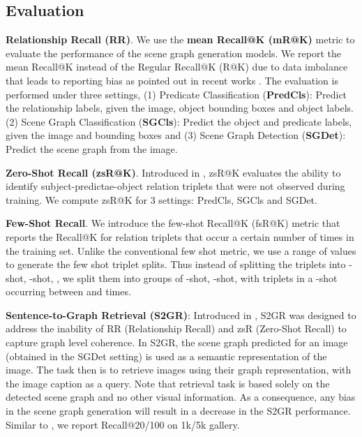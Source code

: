 \documentclass[final]{cvpr}
\begin{document}
\subsection{Evaluation}


\noindent
\textbf{Relationship Recall (RR)}. We use the \textbf{mean Recall@K (mR@K)} metric \cite{tang2019learning} to evaluate the performance of the scene graph generation models. We report the mean Recall@K instead of the Regular Recall@K (R@K) due to data imbalance that leads to reporting bias as pointed out in recent works \cite{tang2020unbiased}. The evaluation is performed under three settings, (1) Predicate Classification (\textbf{PredCls}): Predict the relationship labels, given the image, object bounding boxes and object labels. (2) Scene Graph Classification (\textbf{SGCls}): Predict the object and predicate labels, given the image and bounding boxes and (3) Scene Graph Detection (\textbf{SGDet}): Predict the scene graph from the image.

\vspace{0.05in}
\noindent
\textbf{Zero-Shot Recall (zsR@K)}. Introduced in \cite{lu2016visual}, zsR@K evaluates the ability 
to identify subject-predictae-object relation triplets that were not observed during training. We compute zsR@K for 3 settings: PredCls, SGCls and SGDet.

\vspace{0.05in}
\noindent
\textbf{Few-Shot Recall}. We introduce the few-shot Recall@K (fsR@K) metric that reports the Recall@K for relation triplets that occur a certain number of times in the training set. Unlike the conventional few shot metric, we use a range of values to generate the few shot triplet splits. Thus instead of splitting the triplets into -shot, -shot, \etc, we split them into groups of -shot, -shot, \etc with triplets in a -shot occurring between  and  times. 


\vspace{0.05in}
\noindent
\textbf{Sentence-to-Graph Retrieval (S2GR)}: Introduced in \cite{tang2020unbiased}, S2GR was designed to address the inability of RR (Relationship Recall) and zsR (Zero-Shot Recall) to capture graph level coherence. In S2GR, the scene graph predicted for an image (obtained in the SGDet setting) is used as a semantic representation of the image. The task then is to retrieve images using their graph representation, with the image caption as a query. Note that retrieval task is based solely on the detected scene graph and no other visual information. As a consequence, any bias in the scene graph generation will result in a decrease in the S2GR performance.  Similar to \cite{tang2020unbiased}, we report Recall@20/100 on 1k/5k gallery.
\end{document}
